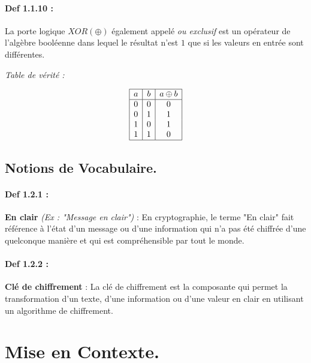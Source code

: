 \documentclass{article}
\begin{document}
\paragraph{Def 1.1.10 :}\label{def-1.1.10}

La porte logique \(XOR (\oplus)\) également appelé \textit{ou exclusif}
est un opérateur de l'algèbre booléenne dans lequel le résultat n'est
\(1\) que si les valeurs en entrée sont différentes.
\begin{center}
	\textit{Table de vérité :}
\end{center}
 \[
\begin{array}{|c|c|c|}
	\hline
	a & b & a \oplus b \\
	\hline
	0 & 0 & 0 \\
	0 & 1 & 1 \\
	1 & 0 & 1 \\
	1 & 1 & 0 \\
	\hline
\end{array}
\]

\subsection{Notions de Vocabulaire.}\label{notions-de-vocabulaire.}

\paragraph{Def 1.2.1 :}\label{def-1.2.1}

\textbf{En clair} \textit{(Ex : "Message en clair")} : En cryptographie,
le terme "En clair" fait référence à l'état d'un message ou d'une
information qui n'a pas été chiffrée d'une quelconque manière et qui est
compréhensible par tout le monde.

\paragraph{Def 1.2.2 :}\label{def-1.2.2}

\textbf{Clé de chiffrement} : La clé de chiffrement est la composante
qui permet la transformation d'un texte, d'une information ou d'une
valeur en clair en utilisant un algorithme de chiffrement.

\section{Mise en Contexte.}\label{contexte.}
\end{document}

